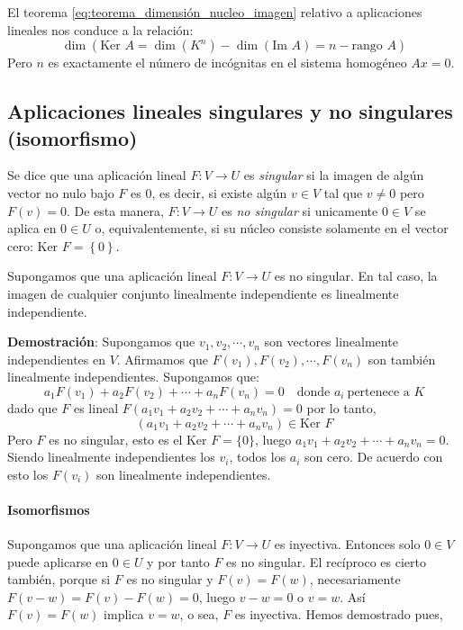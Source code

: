 El teorema \ref{eq:teorema_dimensión_nucleo_imagen} relativo a aplicaciones lineales nos conduce a la relación:
\[
  \dim(\text{Ker } A = \dim(K^n) - \dim(\text{Im } A) = n - \text{rango } A)
\]
Pero \(n\) es exactamente el número de incógnitas en el sistema homogéneo \(Ax=0\).

\subsection{Aplicaciones lineales singulares y no singulares (isomorfismo)}

Se dice que una aplicación lineal \(F: V \rightarrow U\) es \textit{singular} si la imagen de algún vector no nulo bajo \(F\) es \(0\), es decir, si existe algún \(v \in V\) tal que \(v \neq 0\) pero \(F(v) = 0\). De esta manera, \(F:V \rightarrow U\) es \textit{no singular} si unicamente \(0 \in V\) se aplica en \(0 \in U\) o, equivalentemente, si su núcleo consiste solamente en el vector cero: \(\text{Ker } F = \left\{0\right\}\).

\teorema Supongamos que una aplicación lineal \(F: V \rightarrow U\) es no singular. En tal caso, la imagen de cualquier conjunto linealmente independiente es linealmente independiente.

\textbf{Demostración}: Supongamos que \(v_1, v_2, \cdots, v_n\) son vectores linealmente independientes en \(V\). Afirmamos que \(F(v_1),F(v_2),\cdots, F(v_n)\) son también linealmente independientes. Supongamos que:
\[
  a_1 F(v_1) + a_2 F(v_2) + \cdots + a_n F(v_n) = 0 \quad \text{donde } a_i ~ \text{pertenece a } K
\]
dado que \(F\) es lineal \(F(a_1 v_1 + a_2 v_2 + \cdots + a_n v_n) = 0\) por lo tanto,
\[
  \left(a_1 v_1 + a_2 v_2 + \cdots + a_n v_n\right) \in \text{Ker } F
\]
Pero \(F\) es no singular, esto es el \(\text{Ker }F = \{0\}\), luego \(a_1 v_1 + a_2 v_2 + \cdots + a_n v_n = 0\). Siendo linealmente independientes los \(v_i\), todos los \(a_i\) son cero. De acuerdo con esto los \(F(v_i)\) son linealmente independientes.

\paragraph{Isomorfismos}

Supongamos que una aplicación lineal \(F:V \rightarrow U\) es inyectiva. Entonces solo \(0 \in V\) puede aplicarse en \(0 \in U\) y por tanto \(F\) es no singular. El recíproco es cierto también, porque si \(F\) es no singular y \(F(v)=F(w)\), necesariamente \(F(v-w) = F(v) - F(w) = 0\), luego \(v-w = 0\) o \(v=w\). Así \(F(v) = F(w)\) implica \(v=w\), o sea, \(F\) es inyectiva. Hemos demostrado pues,

